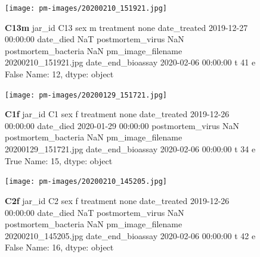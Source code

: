 \begin{figure}[h!]
\centering
\texttt{[image: pm-images/20200210\_151921.jpg]}
\caption{\textbf{C13m} jar\_id                                 C13
sex                                      m
treatment                             none
date\_treated           2019-12-27 00:00:00
date\_died                              NaT
postmortem\_virus                       NaN
postmortem\_bacteria                    NaN
pm\_image\_filename      20200210\_151921.jpg
date\_end\_bioassay      2020-02-06 00:00:00
t                                       41
e                                    False
Name: 12, dtype: object}
\end{figure}
\clearpage

\begin{figure}[h!]
\centering
\texttt{[image: pm-images/20200129\_151721.jpg]}
\caption{\textbf{C1f} jar\_id                                  C1
sex                                      f
treatment                             none
date\_treated           2019-12-26 00:00:00
date\_died              2020-01-29 00:00:00
postmortem\_virus                       NaN
postmortem\_bacteria                    NaN
pm\_image\_filename      20200129\_151721.jpg
date\_end\_bioassay      2020-02-06 00:00:00
t                                       34
e                                     True
Name: 15, dtype: object}
\end{figure}
\clearpage

\begin{figure}[h!]
\centering
\texttt{[image: pm-images/20200210\_145205.jpg]}
\caption{\textbf{C2f} jar\_id                                  C2
sex                                      f
treatment                             none
date\_treated           2019-12-26 00:00:00
date\_died                              NaT
postmortem\_virus                       NaN
postmortem\_bacteria                    NaN
pm\_image\_filename      20200210\_145205.jpg
date\_end\_bioassay      2020-02-06 00:00:00
t                                       42
e                                    False
Name: 16, dtype: object}
\end{figure}
\clearpage

